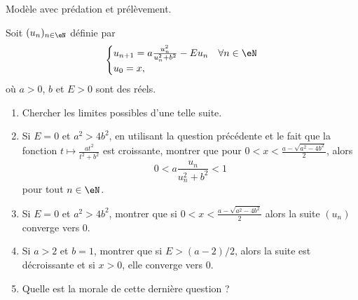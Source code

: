 
\begin{exercice}\label{exoTD3-0014}

	Modèle avec prédation et prélèvement.

	Soit $(u_n)_{n\in\eN}$ définie par
	\begin{equation}
		\begin{cases}
			u_{n+1}=a\frac{ u_n^2 }{ u_n^2+b^2 }-Eu_n	&	\forall n\in\eN\\
			u_0=x,
		\end{cases}
	\end{equation}
	où $a>0$, $b$ et $E>0$ sont des réels.
	\begin{enumerate}
		\item
			Chercher les limites possibles d'une telle suite.
		\item
			Si $E=0$ et $a^2>4b^2$, en utilisant la question précédente et le fait que la fonction $t\mapsto\frac{ at^2 }{ t^2+b^2 }$ est croissante, montrer que pour $0<x<\frac{ a-\sqrt{a^2-4b^2} }{ 2 }$, alors
			\begin{equation}
				0<a\frac{ u_n }{ u_n^2+b^2 }<1
			\end{equation}
			pour tout $n\in\eN$.
		\item
			Si $E=0$ et $a^2>4b^2$, montrer que si $0<x<\frac{ a-\sqrt{a^2-4b^2} }{2}$ alors la suite $(u_n)$ converge vers 0.
		\item
			Si $a>2$ et $b=1$, montrer que si $E>(a-2)/2$, alors la suite est décroissante et si $x>0$, elle converge vers 0.
		\item
			Quelle est la morale de cette dernière question ?
	\end{enumerate}

\end{exercice}
